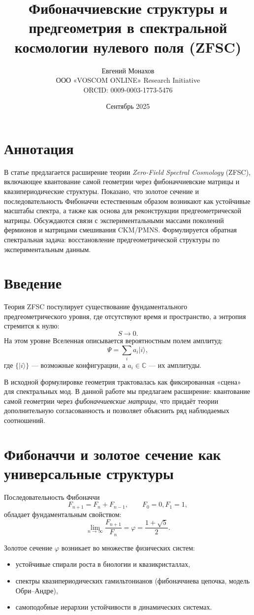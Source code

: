 \documentclass[12pt,a4paper]{article}
\title{Фибоначчиевские структуры и предгеометрия в спектральной космологии нулевого поля (ZFSC)}
\author{Евгений Монахов \\ ООО «VOSCOM ONLINE» Research Initiative \\ ORCID: 0009-0003-1773-5476}
\date{Сентябрь 2025}
\begin{document}
\maketitle

\section*{Аннотация}
В статье предлагается расширение теории \emph{Zero-Field Spectral Cosmology} (ZFSC), включающее квантование самой геометрии через фибоначчиевские матрицы и квазипериодические структуры. Показано, что золотое сечение и последовательность Фибоначчи естественным образом возникают как устойчивые масштабы спектра, а также как основа для реконструкции предгеометрической матрицы. Обсуждаются связи с экспериментальными массами поколений фермионов и матрицами смешивания CKM/PMNS. Формулируется обратная спектральная задача: восстановление предгеометрической структуры по экспериментальным данным.

\section{Введение}
Теория ZFSC постулирует существование фундаментального предгеометрического уровня, где отсутствуют время и пространство, а энтропия стремится к нулю:
\[
S \to 0.
\]
На этом уровне Вселенная описывается вероятностным полем амплитуд:
\[
\Psi = \sum_{i} a_i |i\rangle ,
\]
где $\{|i\rangle\}$ — возможные конфигурации, а $a_i\in \mathbb{C}$ — их амплитуды.

В исходной формулировке геометрия трактовалась как фиксированная «сцена» для спектральных мод. В данной работе мы предлагаем расширение: квантование самой геометрии через \emph{фибоначчиевские матрицы}, что придаёт теории дополнительную согласованность и позволяет объяснить ряд наблюдаемых соотношений.

\section{Фибоначчи и золотое сечение как универсальные структуры}
Последовательность Фибоначчи
\[
F_{n+1} = F_n + F_{n-1}, \qquad F_0=0, F_1=1,
\]
обладает фундаментальным свойством:
\[
\lim_{n\to\infty} \frac{F_{n+1}}{F_n} = \varphi = \frac{1+\sqrt{5}}{2}.
\]

Золотое сечение $\varphi$ возникает во множестве физических систем:
\begin{itemize}
    \item устойчивые спирали роста в биологии и квазикристаллах,
    \item спектры квазипериодических гамильтонианов (фибоначчиева цепочка, модель Обри–Андре),
    \item самоподобные иерархии устойчивости в динамических системах.
\end{itemize}
\end{document}
